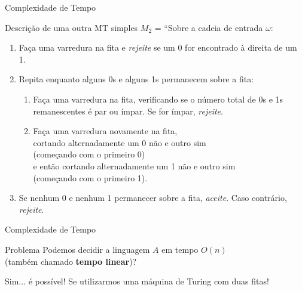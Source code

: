\documentclass[xcolor=dvipsnames,table]{beamer}
\begin{document}
	\begin{frame}[shrink]{Complexidade de Tempo}
		\begin{block}{Descrição de uma outra MT simples}
			$M_2$ = ``Sobre a cadeia de entrada $\omega$:
			\begin{enumerate}
				\item Faça uma varredura na fita e {\it rejeite} se um 0 for encontrado à direita de um 1.
				\item Repita enquanto alguns 0s e alguns 1s permanecem sobre a fita:
				\begin{enumerate}
					\item Faça uma varredura na fita, verificando se o número total de 0s e 1s remanescentes é par ou ímpar. Se for ímpar, {\it rejeite}.
					\item Faça uma varredura novamente na fita, \\cortando alternadamente um 0 não e outro sim \\(começando com o primeiro 0) \\e então cortando alternadamente um 1 não e outro sim \\(começando com o primeiro 1).
				\end{enumerate}
				\item Se nenhum 0 e nenhum 1 permanecer sobre a fita, {\it aceite}. Caso contrário, {\it rejeite}.
			\end{enumerate}
		\end{block}
	\end{frame}
	
	\begin{frame}{Complexidade de Tempo}
		\begin{block}{Problema}
			Podemos decidir a linguagem $A$ em tempo $O(n)$ \\(também chamado {\bf tempo linear})?
		\end{block} \pause
		\begin{exampleblock}{Sim... é possível!}
			Se utilizarmos uma máquina de Turing com duas fitas!
		\end{exampleblock}
	\end{frame}
	
\end{document}
